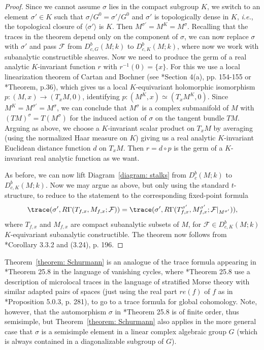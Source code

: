 \documentclass[11pt,letterpaper]{amsart}
\numberwithin{equation}{section}
\begin{document}
\begin{proof}
Since we cannot assume $\sigma$ lies in the compact subgroup $K$, we switch to an element $\sigma'\in K$ such that $\sigma/G^0 = \sigma'/G^0$ and $\sigma'$ is topologically dense in $K$, {\it i.e.}, the topological closure of $\langle \sigma'\rangle$ is $K$. 
Then $M^{\sigma'} = M^K = M^{\sigma}$.
Recalling that the traces in the theorem depend only on the component of $\sigma$, we can now replace $\sigma$ with $\sigma'$ and pass $\mathcal{F}$ from $D^b_{c,G}(M;k)$ to $D^b_{c,K}(M;k)$, where now we work with subanalytic constructible sheaves.
Now we need to produce the germ of a real analytic $K$-invariant function $r$ with $r^{-1}(0)= \{ x\}$.
For this we use a local linearization theorem of Cartan and Bochner (see \cite{Huc90}*{Section 4(a), pp. 154-155} or \cite{Akh95}*{Theorem, p.36}), which gives us a local $K$-equivariant holomorphic isomorphism $p: (M,x)\to (T_xM,0)$,  identifying $p: (M^K,x) \simeq (T_xM^K,0)$. Since $M^K = M^{\sigma'}=M^{\sigma}$, we can conclude that $M^{\sigma}$ is a complex submanifold of $M$
with $(TM)^\sigma = T(M^\sigma)$ for the induced action of $\sigma$ on the tangent bundle $TM$.
Arguing as above, we choose a $K$-invariant scalar product on $T_xM$ by averaging (using the normalized Haar measure on $K$) giving us a real analytic $K$-invariant Euclidean distance function $d$ on $T_xM$. 
Then $r = d\circ p$ is the germ of a $K$-invariant real analytic function as we want. 

As before, we can now lift Diagram~\ref{diagram: stalks} from $D^b_{c}(M;k)$ to $D^b_{c,K}(M;k)$. 
Now we may argue as above, but only using the standard $t$-structure, to reduce to the statement to the corresponding fixed-point formula
\[
\trace(\sigma', R\Gamma(T_{f,x}, M_{f,x};\mathcal{F}))
=
\trace(\sigma', R\Gamma(T_{f,x}^{\sigma'}, M_{f,x}^{\sigma'};\mathcal{F}\vert_{M^{\sigma'}})),
\]
where $T_{f,x}$ and $M_{f,x}$ are compact subanalytic subsets of $M$, for $\mathcal{F}\in D^b_{c,K}(M;k)$ $K$-equivariant subanalytic constructible. 
The theorem now follows from \cite{Sch03}*{Corollary 3.3.2 and (3.24), p. 196}.
\end{proof}

\begin{remark}
Theorem~\ref{theorem: Schurmann} is an analogue of the trace formula appearing in \cite{ABV92}*{Theorem 25.8} in the language of vanishing cycles, where \cite{ABV92}*{Theorem 25.8} use a description of microlocal traces in the language of stratified Morse theory with similar adapted pairs of spaces (just using the real part $re(f)$ of $f$ as in \cite{Sch03}*{Proposition 5.0.3, p. 281}),
to go to a trace formula for global cohomology. 
Note, however, that the automorphism $\sigma$ in \cite{ABV92}*{Theorem 25.8} is of finite order, thus semisimple, but Theorem~\ref{theorem: Schurmann} also applies in the more general case that $\sigma$ is a semisimple element in a linear complex algebraic group $G$ (which is always contained in a diagonalizable subgroup of $G$).
\end{remark}
\end{document}
